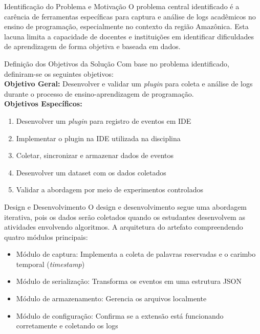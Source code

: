 \documentclass{if-beamer}
\begin{document}
\begin{frame}{Identificação do Problema e Motivação}
\large
O problema central identificado é a carência de ferramentas específicas para captura e análise de logs acadêmicos no ensino de programação, especialmente no contexto da região Amazônica. Esta lacuna limita a capacidade de docentes e instituições em identificar dificuldades de aprendizagem de forma objetiva e baseada em dados.
\end{frame}
\begin{frame}{Definição dos Objetivos da Solução}
Com base no problema identificado, definiram-se os seguintes objetivos:\\
\vspace{0.3in}
\textbf{Objetivo Geral:}
Desenvolver e validar um \textit{plugin} para coleta e análise de logs durante o processo de ensino-aprendizagem de programação.
\vspace{0.3in}\\
\textbf{Objetivos Específicos:}
\begin{enumerate}
    \item Desenvolver um \textit{plugin} para registro de eventos em IDE
    \item Implementar o plugin na IDE utilizada na disciplina
    \item Coletar, sincronizar e armazenar dados de eventos
    \item Desenvolver um dataset com os dados coletados
    \item Validar a abordagem por meio de experimentos controlados
\end{enumerate}

\end{frame}
\begin{frame}{Design e Desenvolvimento}
O design e desenvolvimento segue uma abordagem iterativa, pois os dados serão coletados quando os estudantes desenvolvem as atividades envolvendo algoritmos. A arquitetura do artefato compreendendo quatro módulos principais:\\
\vspace{0.3in}

\begin{itemize}
\item Módulo de captura: Implementa a coleta de palavras reservadas e o carimbo temporal (\textit{timestamp})
\item Módulo de serialização: Transforma os eventos em uma estrutura JSON
\item Módulo de armazenamento: Gerencia os arquivos localmente
\item Módulo de configuração: Confirma se a extensão está funcionando corretamente e coletando os logs
\end{itemize}
\end{frame}
\end{document}
